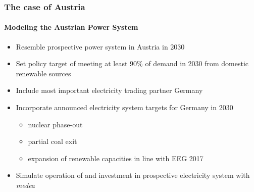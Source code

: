 \documentclass[aspectratio=1610, xcolor=dvipsnames,handout]{beamer} %
\begin{document}
    \begin{frame}
        \frametitle{The case of Austria}
        \framesubtitle{Modeling the Austrian Power System}
        \begin{itemize}
            \item Resemble prospective power system in Austria in 2030
            \item Set policy target of meeting at least $90\%$ of demand in 2030 from domestic renewable sources
            \medskip
            \item Include most important electricity trading partner Germany
            \item Incorporate announced electricity system targets for Germany in 2030
            \begin{itemize}
                \item nuclear phase-out
                \item partial coal exit
                \item expansion of renewable capacities in line with EEG 2017
            \end{itemize}
            \medskip
            \item Simulate operation of and investment in prospective electricity system with \emph{medea}
        \end{itemize}
\end{frame}
\end{document}
